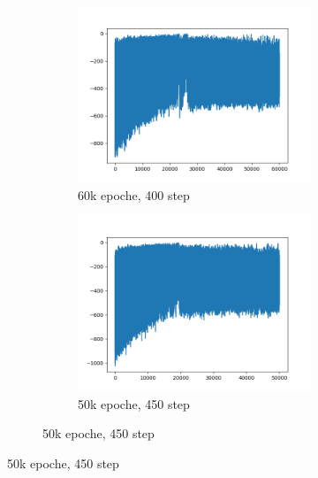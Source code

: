 \begin{figure}[H]
	\begin{subfigure}{\textwidth}
		\centering
		\begin{subfigure}{.33\textwidth}
			\centering
			\includegraphics[width=1\linewidth]{img/plot_60k_400.png}
			\caption{60k epoche, 400 step}
		\end{subfigure}%
		\begin{subfigure}{.33\textwidth}
			\centering
			\includegraphics[width=1\linewidth]{img/plot_50k_450.png}
			\caption{50k epoche, 450 step}
		\end{subfigure}%

\end{subfigure}
\end{figure}
